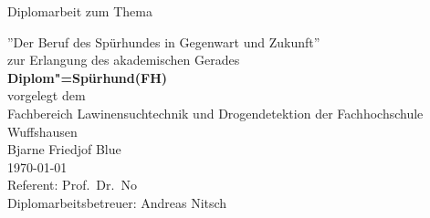 
\hypersetup{pageanchor=false}%
\begin{titlepage}
\vspace{4em}
\center%
\Large{\textsf{Diplomarbeit zum Thema}}
\vspace{1em}

\Huge{\textsf{''Der Beruf des Spürhundes in Gegenwart und Zukunft''}}
\vspace{2em}
\\
\Large{
	\textsf{
		zur Erlangung des akademischen Gerades\\
		\textbf{Diplom"=Spürhund(FH)}
		\vspace{2em}
		\\
		vorgelegt dem\\
		Fachbereich Lawinensuchtechnik und Drogendetektion der Fachhochschule Wuffshausen
		}
	}
\vspace{2em}
\\
\Large{
	\textsf{
		Bjarne Friedjof Blue\\
		\today
		\vspace{2em}
		\\
		Referent: Prof.~Dr.~No\\
		Diplomarbeitsbetreuer: Andreas Nitsch
	}
}

\end{titlepage}
\hypersetup{pageanchor=true}
